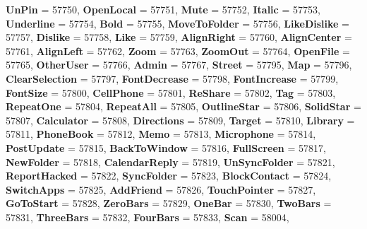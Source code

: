 \begin{DoxyCompactItemize}
\newline
{\bfseries Un\+Pin} = 57750, 
{\bfseries Open\+Local} = 57751, 
{\bfseries Mute} = 57752, 
{\bfseries Italic} = 57753, 
\newline
{\bfseries Underline} = 57754, 
{\bfseries Bold} = 57755, 
{\bfseries Move\+To\+Folder} = 57756, 
{\bfseries Like\+Dislike} = 57757, 
\newline
{\bfseries Dislike} = 57758, 
{\bfseries Like} = 57759, 
{\bfseries Align\+Right} = 57760, 
{\bfseries Align\+Center} = 57761, 
\newline
{\bfseries Align\+Left} = 57762, 
{\bfseries Zoom} = 57763, 
{\bfseries Zoom\+Out} = 57764, 
{\bfseries Open\+File} = 57765, 
\newline
{\bfseries Other\+User} = 57766, 
{\bfseries Admin} = 57767, 
{\bfseries Street} = 57795, 
{\bfseries Map} = 57796, 
\newline
{\bfseries Clear\+Selection} = 57797, 
{\bfseries Font\+Decrease} = 57798, 
{\bfseries Font\+Increase} = 57799, 
{\bfseries Font\+Size} = 57800, 
\newline
{\bfseries Cell\+Phone} = 57801, 
{\bfseries Re\+Share} = 57802, 
{\bfseries Tag} = 57803, 
{\bfseries Repeat\+One} = 57804, 
\newline
{\bfseries Repeat\+All} = 57805, 
{\bfseries Outline\+Star} = 57806, 
{\bfseries Solid\+Star} = 57807, 
{\bfseries Calculator} = 57808, 
\newline
{\bfseries Directions} = 57809, 
{\bfseries Target} = 57810, 
{\bfseries Library} = 57811, 
{\bfseries Phone\+Book} = 57812, 
\newline
{\bfseries Memo} = 57813, 
{\bfseries Microphone} = 57814, 
{\bfseries Post\+Update} = 57815, 
{\bfseries Back\+To\+Window} = 57816, 
\newline
{\bfseries Full\+Screen} = 57817, 
{\bfseries New\+Folder} = 57818, 
{\bfseries Calendar\+Reply} = 57819, 
{\bfseries Un\+Sync\+Folder} = 57821, 
\newline
{\bfseries Report\+Hacked} = 57822, 
{\bfseries Sync\+Folder} = 57823, 
{\bfseries Block\+Contact} = 57824, 
{\bfseries Switch\+Apps} = 57825, 
\newline
{\bfseries Add\+Friend} = 57826, 
{\bfseries Touch\+Pointer} = 57827, 
{\bfseries Go\+To\+Start} = 57828, 
{\bfseries Zero\+Bars} = 57829, 
\newline
{\bfseries One\+Bar} = 57830, 
{\bfseries Two\+Bars} = 57831, 
{\bfseries Three\+Bars} = 57832, 
{\bfseries Four\+Bars} = 57833, 
\newline
{\bfseries Scan} = 58004, 

\end{DoxyCompactItemize}
